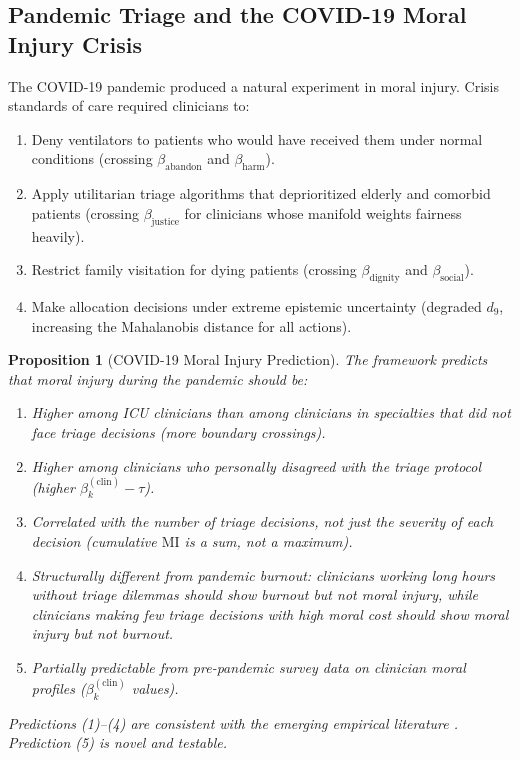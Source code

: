 \documentclass[12pt]{article}
\newtheorem{proposition}[theorem]{Proposition}
\theoremstyle{definition}
\theoremstyle{remark}
\newcommand{\MI}{\mathrm{MI}}              %
\begin{document}
\subsection{Pandemic Triage and the COVID-19 Moral Injury Crisis}

The COVID-19 pandemic produced a natural experiment in moral injury.  Crisis standards of care required clinicians to:

\begin{enumerate}
    \item Deny ventilators to patients who would have received them under normal conditions (crossing $\beta_{\text{abandon}}$ and $\beta_{\text{harm}}$).
    \item Apply utilitarian triage algorithms that deprioritized elderly and comorbid patients (crossing $\beta_{\text{justice}}$ for clinicians whose manifold weights fairness heavily).
    \item Restrict family visitation for dying patients (crossing $\beta_{\text{dignity}}$ and $\beta_{\text{social}}$).
    \item Make allocation decisions under extreme epistemic uncertainty (degraded $d_9$, increasing the Mahalanobis distance for all actions).
\end{enumerate}

\begin{proposition}[COVID-19 Moral Injury Prediction]
\label{prop:covid_mi}
The framework predicts that moral injury during the pandemic should be:
\begin{enumerate}
    \item Higher among ICU clinicians than among clinicians in specialties that did not face triage decisions (more boundary crossings).
    \item Higher among clinicians who personally disagreed with the triage protocol (higher $\beta_k^{(\text{clin})} - \tau$).
    \item Correlated with the \emph{number} of triage decisions, not just the \emph{severity} of each decision (cumulative $\MI$ is a sum, not a maximum).
    \item Structurally different from pandemic burnout: clinicians working long hours without triage dilemmas should show burnout but not moral injury, while clinicians making few triage decisions with high moral cost should show moral injury but not burnout.
    \item Partially predictable from pre-pandemic survey data on clinician moral profiles ($\beta_k^{(\text{clin})}$ values).
\end{enumerate}
Predictions (1)--(4) are consistent with the emerging empirical literature \cite{greenberg2020,rushton2018}.  Prediction (5) is novel and testable.
\end{proposition}
\end{document}
